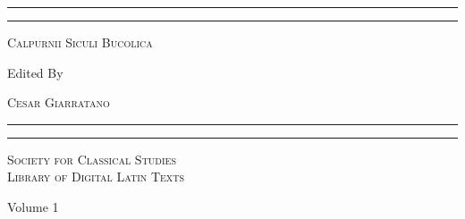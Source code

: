 \documentclass[a4paper, 11pt, oneside]{book} %
\begin{document}
\begin{titlepage} %
\centering %
\scshape %

\vspace*{\baselineskip} %

\rule{\textwidth}{1.6pt}\vspace*{-\baselineskip}\vspace*{2pt} %
\rule{\textwidth}{0.4pt} %

\vspace{1\baselineskip} %

\textsc{\Huge Calpurnii Siculi Bucolica} %

\vspace{2.25\baselineskip} %


Edited By

\vspace{0.5\baselineskip} %

{\scshape\LARGE Cesar Giarratano} %

\vspace{0.5\baselineskip} %
\rule{\textwidth}{0.4pt}\vspace*{-\baselineskip}\vspace{3.2pt} %
\rule{\textwidth}{1.6pt} %

\vspace{12\baselineskip} %


{\scshape\Large Society for Classical Studies}\\
\medskip %
{\scshape\Large Library of Digital Latin Texts}\\
\vspace{2\baselineskip} %

{\large Volume 1}\\
\vfill %


\end{titlepage}
\end{document}
